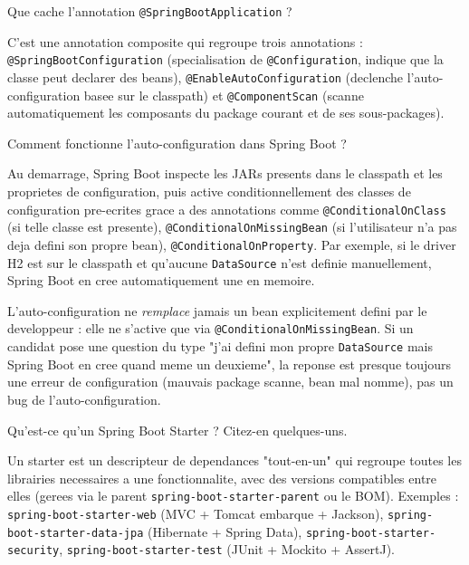 \documentclass[11pt,a4paper]{article}
\begin{document}
\begin{question} Que cache l'annotation \texttt{@SpringBootApplication} ?
\end{question}
\begin{reponse}
C'est une annotation composite qui regroupe trois annotations : \texttt{@SpringBootConfiguration} (specialisation de \texttt{@Configuration}, indique que la classe peut declarer des beans), \texttt{@EnableAutoConfiguration} (declenche l'auto-configuration basee sur le classpath) et \texttt{@ComponentScan} (scanne automatiquement les composants du package courant et de ses sous-packages).
\end{reponse}

\begin{question} Comment fonctionne l'auto-configuration dans Spring Boot ?
\end{question}
\begin{reponse}
Au demarrage, Spring Boot inspecte les JARs presents dans le classpath et les proprietes de configuration, puis active conditionnellement des classes de configuration pre-ecrites grace a des annotations comme \texttt{@ConditionalOnClass} (si telle classe est presente), \texttt{@ConditionalOnMissingBean} (si l'utilisateur n'a pas deja defini son propre bean), \texttt{@ConditionalOnProperty}. Par exemple, si le driver H2 est sur le classpath et qu'aucune \texttt{DataSource} n'est definie manuellement, Spring Boot en cree automatiquement une en memoire.
\end{reponse}

\begin{piege}
L'auto-configuration ne \emph{remplace} jamais un bean explicitement defini par le developpeur : elle ne s'active que via \texttt{@ConditionalOnMissingBean}. Si un candidat pose une question du type "j'ai defini mon propre \texttt{DataSource} mais Spring Boot en cree quand meme un deuxieme", la reponse est presque toujours une erreur de configuration (mauvais package scanne, bean mal nomme), pas un bug de l'auto-configuration.
\end{piege}

\begin{question} Qu'est-ce qu'un Spring Boot Starter ? Citez-en quelques-uns.
\end{question}
\begin{reponse}
Un starter est un descripteur de dependances "tout-en-un" qui regroupe toutes les librairies necessaires a une fonctionnalite, avec des versions compatibles entre elles (gerees via le parent \texttt{spring-boot-starter-parent} ou le BOM). Exemples : \texttt{spring-boot-starter-web} (MVC + Tomcat embarque + Jackson), \texttt{spring-boot-starter-data-jpa} (Hibernate + Spring Data), \texttt{spring-boot-starter-security}, \texttt{spring-boot-starter-test} (JUnit + Mockito + AssertJ).
\end{reponse}
\end{document}
